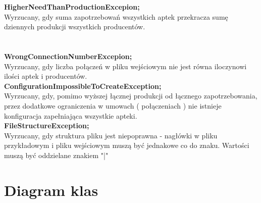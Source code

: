 \documentclass[]{article}
\begin{document}
    \textbf{ HigherNeedThanProductionExcepion;}\\
    Wyrzucany, gdy suma zapotrzebowań wszystkich aptek przekracza sumę dziennych produkcji wszystkich producentów.\\\\\\

    \textbf{ WrongConnectionNumberExcepion;}\\
    Wyrzucany, gdy liczba połączeń w pliku wejściowym nie jest równa iloczynowi ilości aptek i producentów.\\

    \textbf{ ConfigurationImpossibleToCreateException;}\\
    Wyrzucany, gdy, pomimo wyższej łącznej produkcji od łącznego zapotrzebowania, przez dodatkowe ograniczenia w umowach ( połączeniach ) nie istnieje konfiguracja zapełniająca wszystkie apteki.\\

    \textbf{ FileStructureException;}\\
    Wyrzucany, gdy struktura pliku jest niepoprawna - nagłówki w pliku przykładowym i pliku wejściowym muszą być jednakowe co do znaku. Wartości muszą być oddzielane znakiem "|"


    \section{Diagram klas}

    \noindent
\end{document}
